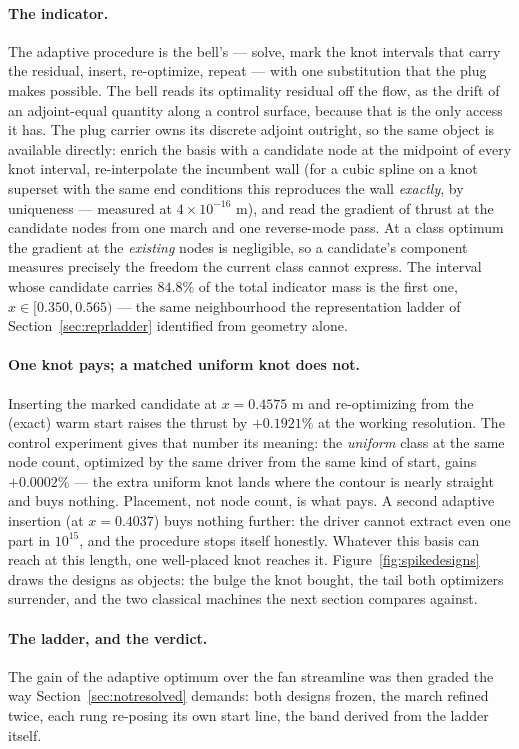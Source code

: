\paragraph{The indicator.} The adaptive procedure is the bell's
--- solve, mark the knot intervals that carry the residual, insert,
re-optimize, repeat --- with one substitution that the plug makes
possible. The bell reads its optimality residual off the flow, as the
drift of an adjoint-equal quantity along a control surface, because
that is the only access it has. The plug carrier owns its discrete
adjoint outright, so the same object is available directly: enrich
the basis with a candidate node at the midpoint of every knot
interval, re-interpolate the incumbent wall (for a cubic spline on a
knot superset with the same end conditions this reproduces the wall
\emph{exactly}, by uniqueness --- measured at $4\times10^{-16}$ m),
and read the gradient of thrust at the candidate nodes from one march
and one reverse-mode pass. At a class optimum the gradient at the
\emph{existing} nodes is negligible, so a candidate's component
measures precisely the freedom the current class cannot express.
The interval whose candidate carries $84.8\%$ of the total indicator
mass is the first one, $x \in [0.350, 0.565)$ --- the same
neighbourhood the representation ladder of
Section~\ref{sec:reprladder} identified from geometry alone.

\paragraph{One knot pays; a matched uniform knot does not.} Inserting
the marked candidate at $x = 0.4575$ m and re-optimizing from the
(exact) warm start raises the thrust by $+0.1921\%$ at the working
resolution. The control experiment gives that number its meaning: the
\emph{uniform} class at the same node count, optimized by the same
driver from the same kind of start, gains $+0.0002\%$ --- the extra
uniform knot lands where the contour is nearly straight and buys
nothing. Placement, not node count, is what pays. A second adaptive
insertion (at $x = 0.4037$) buys nothing further: the driver cannot
extract even one part in $10^{15}$, and the procedure stops itself
honestly. Whatever this basis can reach at this length, one
well-placed knot reaches it. Figure~\ref{fig:spikedesigns}
draws the designs as objects: the bulge the knot bought, the tail
both optimizers surrender, and the two classical machines the next
section compares against.

\paragraph{The ladder, and the verdict.} The gain of the adaptive
optimum over the fan streamline was then graded the way
Section~\ref{sec:notresolved} demands: both designs frozen, the march
refined twice, each rung re-posing its own start line, the band
derived from the ladder itself.

